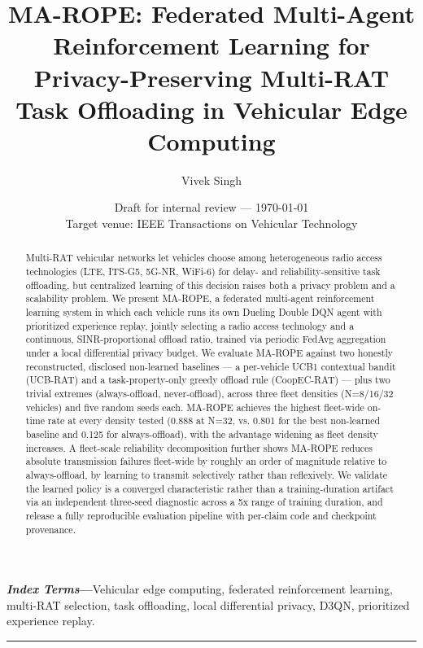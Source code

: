 \documentclass[10pt,twocolumn]{article}
\title{\textbf{MA-ROPE: Federated Multi-Agent Reinforcement Learning for Privacy-Preserving Multi-RAT Task Offloading in Vehicular Edge Computing}}
\author{Vivek Singh}
\date{Draft for internal review --- \today\\ \small{Target venue: IEEE Transactions on Vehicular Technology}}
\begin{document}
\maketitle
\thispagestyle{empty}

\begin{abstract}
Multi-RAT vehicular networks let vehicles choose among heterogeneous radio access technologies
(LTE, ITS-G5, 5G-NR, WiFi-6) for delay- and reliability-sensitive task offloading, but centralized
learning of this decision raises both a privacy problem and a scalability problem. We present
MA-ROPE, a federated multi-agent reinforcement learning system in which each vehicle runs its own
Dueling Double DQN agent with prioritized experience replay, jointly selecting a radio access
technology and a continuous, SINR-proportional offload ratio, trained via periodic FedAvg
aggregation under a local differential privacy budget. We evaluate MA-ROPE against two honestly
reconstructed, disclosed non-learned baselines --- a per-vehicle UCB1 contextual bandit
(UCB-RAT) and a task-property-only greedy offload rule (CoopEC-RAT) --- plus two trivial extremes
(always-offload, never-offload), across three fleet densities (N=8/16/32 vehicles) and five random
seeds each. MA-ROPE achieves the highest fleet-wide on-time rate at every density tested (0.888 at
N=32, vs. 0.801 for the best non-learned baseline and 0.125 for always-offload), with the advantage
widening as fleet density increases. A fleet-scale reliability decomposition further shows MA-ROPE
reduces absolute transmission failures fleet-wide by roughly an order of magnitude relative to
always-offload, by learning to transmit selectively rather than reflexively. We validate the
learned policy is a converged characteristic rather than a training-duration artifact via an
independent three-seed diagnostic across a 5x range of training duration, and release a fully
reproducible evaluation pipeline with per-claim code and checkpoint provenance.
\end{abstract}

\vspace{0.3em}
\noindent\textbf{\textit{Index Terms}---}Vehicular edge computing, federated reinforcement learning, multi-RAT selection, task offloading, local differential privacy, D3QN, prioritized experience replay.
\vspace{0.8em}
\hrule
\vspace{1em}
\end{document}
